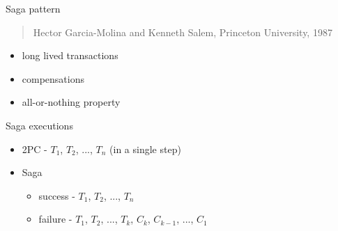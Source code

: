 \documentclass{beamer}
\begin{document}
\begin{frame}{Saga pattern}

\begin{quotation}
\begin{center}
    Hector Garcia-Molina and Kenneth Salem, Princeton University, 1987
\end{center}
\end{quotation}

\Large
\begin{itemize}
    \item long lived transactions
    \item compensations
    \item all-or-nothing property
\end{itemize}

\end{frame}


\begin{frame}{Saga executions}

\Large
\begin{itemize}
    \item 2PC - $T_1$, $T_2$, ..., $T_n$ (in a single step)
    \item Saga
    \begin{itemize}
        \Large
        \item success - $T_1$, $T_2$, ..., $T_n$
        \item failure - $T_1$, $T_2$, ..., $T_k$, $C_k$, $C_{k-1}$, ..., $C_1$
    \end{itemize}
\end{itemize}

\end{frame}
\end{document}
